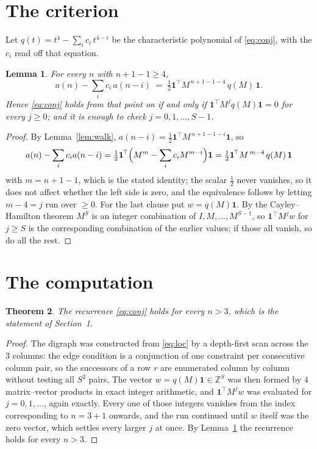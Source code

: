 \documentclass[11pt,a4paper]{article}
\theoremstyle{plain}
\newtheorem{theorem}{Theorem}
\newtheorem{lemma}[theorem]{Lemma}
\theoremstyle{definition}
\begin{document}
\section{The criterion}

Let $q(t)=t^{4}-\sum_i c_i\,t^{4-i}$ be the characteristic polynomial of
\eqref{eq:conj}, with the $c_i$ read off that equation.

\begin{lemma}\label{lem:crit}
For every $n$ with $n+1-1\ge4$,
\[
a(n)-\sum_i c_i\,a(n-i)\;=\;\tfrac1{2}\mathbf{1}^{\!\top}M^{\,n+1-1-4}\,q(M)\,\mathbf{1} .
\]
Hence \eqref{eq:conj} holds from that point on if and only if
$\mathbf{1}^{\!\top}M^{j}q(M)\mathbf{1}=0$ for every $j\ge0$; and it is enough to check
$j=0,1,\dots,S-1$.
\end{lemma}

\begin{proof}
By Lemma~\ref{lem:walk}, $a(n-i)=\tfrac1{2}\mathbf{1}^{\!\top}M^{\,n+1-1-i}\mathbf{1}$, so
\[
a(n)-\sum_i c_i a(n-i)
=\tfrac1{2}\mathbf{1}^{\!\top}\Bigl(M^{m}-\sum_i c_i M^{m-i}\Bigr)\mathbf{1}
=\tfrac1{2}\mathbf{1}^{\!\top}M^{\,m-4}\,q(M)\,\mathbf{1}
\]
with $m=n+1-1$, which is the stated identity; the scalar $\tfrac1{2}$ never vanishes, so it does not affect whether the left side is zero, and the equivalence follows by letting
$m-4=j$ run over $\ge0$. For the last clause put $w=q(M)\mathbf{1}$. By the
Cayley--Hamilton theorem $M^{S}$ is an integer combination of $I,M,\dots,M^{S-1}$, so
$\mathbf{1}^{\!\top}M^{j}w$ for $j\ge S$ is the corresponding combination of the earlier
values; if those all vanish, so do all the rest.
\end{proof}

\section{The computation}

\begin{theorem}
The recurrence \eqref{eq:conj} holds for every $n>3$, which is the statement of
Section~1.
\end{theorem}

\begin{proof}
The digraph was constructed from \eqref{eq:loc} by a depth-first scan across the $3$
columns: the edge condition is a conjunction of one constraint per consecutive column
pair, so the successors of a row $r$ are enumerated column by column without testing all
$S^2$ pairs. The vector $w=q(M)\mathbf{1}\in\mathbb{Z}^{S}$ was then formed by $4$
matrix--vector products in exact integer arithmetic, and $\mathbf{1}^{\!\top}M^{j}w$ was
evaluated for $j=0,1,\dots$, again exactly. Every one of those integers vanishes from the
index corresponding to $n=3+1$ onwards, and the run continued until $w$ itself was the
zero vector, which settles every larger $j$ at once. By Lemma~\ref{lem:crit} the recurrence
holds for every $n>3$.
\end{proof}
\end{document}

